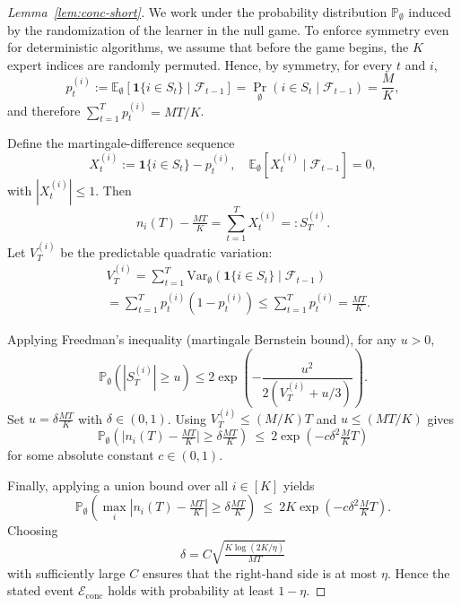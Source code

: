\documentclass[a4paper,14pt]{extarticle}
\theoremstyle{plain}
\begin{document}
\begin{proof}[ Lemma~\ref{lem:conc-short}]
We work under the probability distribution $\mathbb P_\emptyset$ induced by the randomization of the learner in the null game.
To enforce symmetry even for deterministic algorithms, we assume that before the game begins, the $K$ expert indices are randomly permuted.
Hence, by symmetry, for every $t$ and $i$,
\[
p_t^{(i)} := \mathbb E_\emptyset[\mathbf 1\{i\in S_t\} \mid \mathcal F_{t-1}]
= \Pr_\emptyset(i\in S_t \mid \mathcal F_{t-1})
= \frac{M}{K},
\]
and therefore $\sum_{t=1}^T p_t^{(i)} = MT/K$.

Define the martingale-difference sequence
\[
X_t^{(i)} := \mathbf 1\{i \in S_t\} - p_t^{(i)},
\quad
\mathbb E_\emptyset[X_t^{(i)} \mid \mathcal F_{t-1}] = 0,
\]
with $|X_t^{(i)}| \le 1$. Then
\[
n_i(T) - \tfrac{MT}{K} = \sum_{t=1}^T X_t^{(i)} =: S_T^{(i)}.
\]
Let $V_T^{(i)}$ be the predictable quadratic variation:
\begin{align*}
&V_T^{(i)} = \sum_{t=1}^T
\mathrm{Var}_\emptyset(\mathbf 1\{i\in S_t\}\mid\mathcal F_{t-1})
\\
& = \sum_{t=1}^T p_t^{(i)}(1-p_t^{(i)})
\le \sum_{t=1}^T p_t^{(i)} = \tfrac{MT}{K}.
\end{align*}

Applying Freedman’s inequality (martingale Bernstein bound), for any $u>0$,
\[
\mathbb P_\emptyset\!\left(|S_T^{(i)}|\ge u\right)
\le
2\exp\!\left(-\frac{u^2}{2(V_T^{(i)} + u/3)}\right).
\]
Set $u=\delta \tfrac{MT}{K}$ with $\delta\in(0,1)$.
Using $V_T^{(i)}\le (M/K)T$ and $u\le (MT/K)$ gives
\[
\mathbb P_\emptyset\!\left(\big|n_i(T)-\tfrac{MT}{K}\big|\ge \delta\tfrac{MT}{K}\right)
\ \le\ 2\exp\!\left(-c\delta^2\tfrac{M}{K}T\right)
\]
for some absolute constant $c\in(0,1)$.

Finally, applying a union bound over all $i\in[K]$ yields
\[
\mathbb P_\emptyset\!\left(\max_i |n_i(T)-\tfrac{MT}{K}|\ge \delta\tfrac{MT}{K}\right)
\ \le\ 2K\exp\!\left(-c\delta^2\tfrac{M}{K}T\right).
\]
Choosing
\[
\delta = C\sqrt{ \tfrac{K\log(2K/\eta)}{M T} }
\]
with sufficiently large $C$ ensures that the right-hand side is at most $\eta$.
Hence the stated event $\mathcal E_{\mathrm{conc}}$ holds with probability at least $1-\eta$.
\end{proof}
\end{document}
